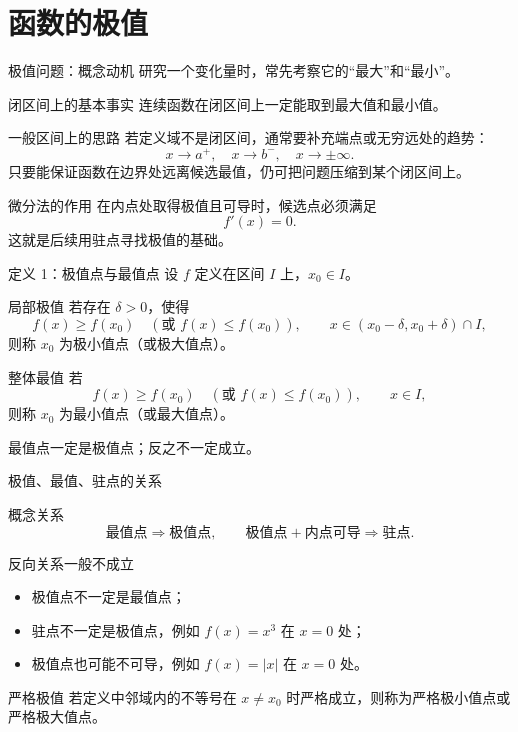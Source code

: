 \documentclass[aspectratio=169,10pt]{ctexbeamer}
\begin{document}
\section{函数的极值}

\begin{frame}[t]{极值问题：概念动机}
\footnotesize
研究一个变化量时，常先考察它的“最大”和“最小”。

\begin{block}{闭区间上的基本事实}
连续函数在闭区间上一定能取到最大值和最小值。
\end{block}

\begin{block}{一般区间上的思路}
若定义域不是闭区间，通常要补充端点或无穷远处的趋势：
\[
  x\to a^+,\quad x\to b^-,\quad x\to\pm\infty.
\]
只要能保证函数在边界处远离候选最值，仍可把问题压缩到某个闭区间上。
\end{block}

\begin{alertblock}{微分法的作用}
在内点处取得极值且可导时，候选点必须满足
\[
  f'(x)=0.
\]
这就是后续用驻点寻找极值的基础。
\end{alertblock}
\end{frame}

\begin{frame}[t]{定义 1：极值点与最值点}
\small
设 $f$ 定义在区间 $I$ 上，$x_0\in I$。

\begin{block}{局部极值}
若存在 $\delta>0$，使得
\[
  f(x)\ge f(x_0)\quad(\text{或 }f(x)\le f(x_0)),
  \qquad x\in(x_0-\delta,x_0+\delta)\cap I,
\]
则称 $x_0$ 为极小值点（或极大值点）。
\end{block}

\begin{block}{整体最值}
若
\[
  f(x)\ge f(x_0)\quad(\text{或 }f(x)\le f(x_0)),
  \qquad x\in I,
\]
则称 $x_0$ 为最小值点（或最大值点）。
\end{block}

最值点一定是极值点；反之不一定成立。
\end{frame}

\begin{frame}[t]{极值、最值、驻点的关系}
\small
\begin{block}{概念关系}
\[
\text{最值点}\Longrightarrow\text{极值点},
\qquad
\text{极值点}+\text{内点可导}\Longrightarrow\text{驻点}.
\]
\end{block}

\begin{block}{反向关系一般不成立}
\begin{itemize}
  \item 极值点不一定是最值点；
  \item 驻点不一定是极值点，例如 $f(x)=x^3$ 在 $x=0$ 处；
  \item 极值点也可能不可导，例如 $f(x)=|x|$ 在 $x=0$ 处。
\end{itemize}
\end{block}

\begin{block}{严格极值}
若定义中邻域内的不等号在 $x\ne x_0$ 时严格成立，则称为严格极小值点或严格极大值点。
\end{block}
\end{frame}
\end{document}
